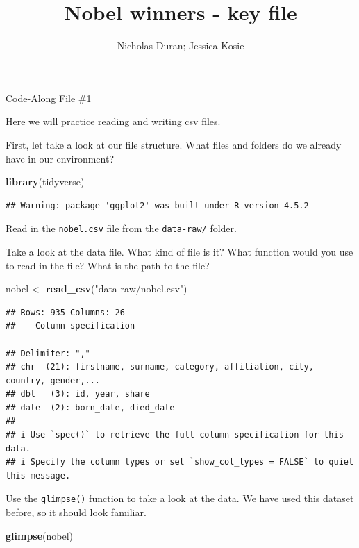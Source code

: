 \documentclass[
]{article}
\title{Nobel winners - key file}
\author{Nicholas Duran; Jessica Kosie}
\date{}
\newenvironment{Shaded}{\begin{snugshade}}{\end{snugshade}}
\newcommand{\FunctionTok}[1]{\textcolor[rgb]{0.13,0.29,0.53}{\textbf{#1}}}
\newcommand{\NormalTok}[1]{#1}
\newcommand{\OtherTok}[1]{\textcolor[rgb]{0.56,0.35,0.01}{#1}}
\newcommand{\StringTok}[1]{\textcolor[rgb]{0.31,0.60,0.02}{#1}}
\begin{document}
\maketitle

Code-Along File \#1

Here we will practice reading and writing csv files.

First, let take a look at our file structure. What files and folders do
we already have in our environment?

\begin{Shaded}
\begin{Highlighting}[]
\FunctionTok{library}\NormalTok{(tidyverse)}
\end{Highlighting}
\end{Shaded}

\begin{verbatim}
## Warning: package 'ggplot2' was built under R version 4.5.2
\end{verbatim}

Read in the \texttt{nobel.csv} file from the \texttt{data-raw/} folder.

Take a look at the data file. What kind of file is it? What function
would you use to read in the file? What is the path to the file?

\begin{Shaded}
\begin{Highlighting}[]
\NormalTok{nobel }\OtherTok{\textless{}{-}} \FunctionTok{read\_csv}\NormalTok{(}\StringTok{"data{-}raw/nobel.csv"}\NormalTok{)}
\end{Highlighting}
\end{Shaded}

\begin{verbatim}
## Rows: 935 Columns: 26
## -- Column specification --------------------------------------------------------
## Delimiter: ","
## chr  (21): firstname, surname, category, affiliation, city, country, gender,...
## dbl   (3): id, year, share
## date  (2): born_date, died_date
## 
## i Use `spec()` to retrieve the full column specification for this data.
## i Specify the column types or set `show_col_types = FALSE` to quiet this message.
\end{verbatim}

Use the \texttt{glimpse()} function to take a look at the data. We have
used this dataset before, so it should look familiar.

\begin{Shaded}
\begin{Highlighting}[]
\FunctionTok{glimpse}\NormalTok{(nobel)}
\end{Highlighting}
\end{Shaded}
\end{document}
